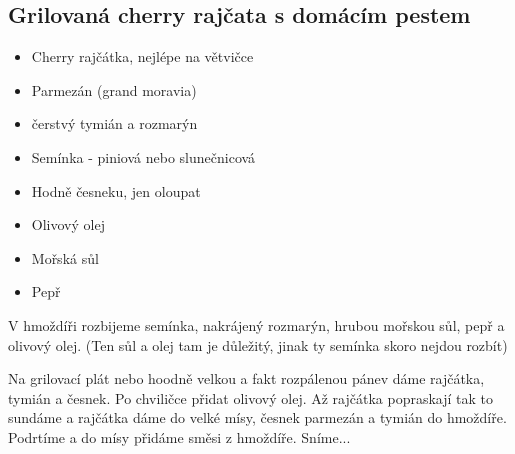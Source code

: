 \documentclass[10pt,a4paper]{article}
\newenvironment{myitemize}
{ \begin{itemize}
    \setlength{\itemsep}{0pt}
    \setlength{\parskip}{0pt}
    \setlength{\parsep}{0pt}     }
{ \end{itemize}                  }
\begin{document}
\subsection{Grilovaná cherry rajčata s domácím pestem}
\begin{minipage}[t]{0,5\textwidth}
\begin{myitemize} 
\item Cherry rajčátka, nejlépe na větvičce
\item Parmezán (grand moravia)
\item čerstvý tymián a rozmarýn
\item Semínka - piniová nebo slunečnicová
\item Hodně česneku, jen oloupat
\item Olivový olej
\item Mořská sůl
\item Pepř
\end{myitemize}
\end{minipage}
\begin{minipage}[t]{0,5\textwidth}
V hmoždíři rozbijeme semínka, nakrájený rozmarýn, hrubou mořskou sůl, pepř a olivový olej. (Ten sůl a olej tam je důležitý, jinak ty semínka skoro nejdou rozbít)

Na grilovací plát nebo hoodně velkou a fakt rozpálenou pánev dáme rajčátka, tymián a česnek. Po chviličce přidat olivový olej. Až rajčátka popraskají tak to sundáme a rajčátka dáme do velké mísy, česnek parmezán a tymián do hmoždíře. Podrtíme a do mísy přidáme směsi z hmoždíře. Sníme...
\end{minipage}
\end{document}
